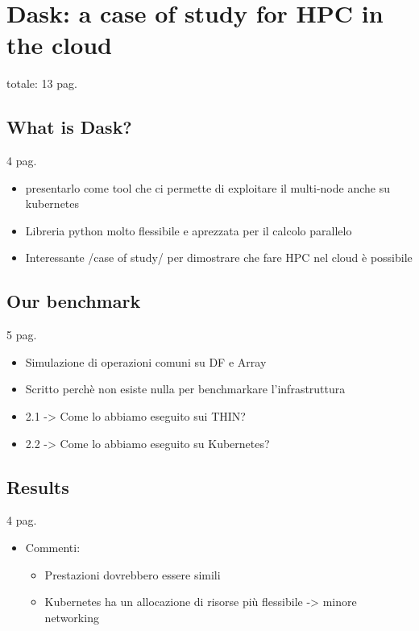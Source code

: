 \chapter{Dask: a case of study for HPC in the cloud}\label{chpt:dask}

totale: 13 pag.

\section{What is Dask?}\label{sec:daskintro}

4 pag.

\begin{itemize}
  \item presentarlo come tool che ci permette di exploitare il multi-node anche
    su kubernetes
  \item Libreria python molto flessibile e aprezzata per il calcolo parallelo
  \item Interessante /case of study/ per dimostrare che fare HPC nel cloud è possibile
\end{itemize}


\section{Our benchmark}\label{sec:daskbenchmark}

5 pag.

\begin{itemize}
  \item Simulazione di operazioni comuni su DF e Array
  \item Scritto perchè non esiste nulla per benchmarkare l'infrastruttura
  \item 2.1 -> Come lo abbiamo eseguito sui THIN?
  \item 2.2 -> Come lo abbiamo eseguito su Kubernetes?
\end{itemize}

\section{Results}\label{sec:daskresults}

4 pag.

\begin{itemize}
  \item Commenti:
    \begin{itemize}
      \item Prestazioni dovrebbero essere simili
      \item Kubernetes ha un allocazione di risorse più flessibile -> minore networking
    \end{itemize}
\end{itemize}
